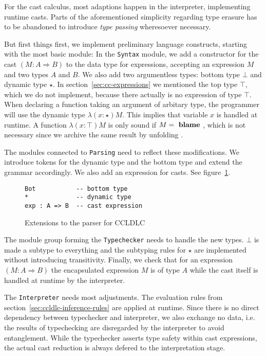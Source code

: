For the cast calculus, most adaptions happen in the interpreter, implementing runtime casts. Parts of the aforementioned simplicity regarding type erasure has to be abandoned to introduce \emph{type passing} wheresoever necessary.

But first things first, we implement preliminary language constructs, starting with the most basic module: In the \texttt{Syntax} module, we add a constructor for the cast $(M : A \Rightarrow B)$ to the data type for expressions, accepting an expression $M$ and two types $A$ and $B$. We also add two argumentless types: bottom type $\bot$ and dynamic type $\star$. In section~\ref{sec:cc-expressions} we mentioned the top type $\top$, which we do not implement, because there actually is no expression of type $\top$. When declaring a function taking an argument of arbitary type, the programmer will use the dynamic type $\lambda(x:\star)M$. This implies that variable $x$ is handled at runtime. A function $\lambda(x:\top)M$ is only sound if $M = \text{ \textbf{blame} }$, which is not necessary since we archive the same result by unfolding .

The modules connected to \texttt{Parsing} need to reflect these modifications. We introduce tokens for the dynamic type and the bottom type and extend the grammar accordingly. We also add an expression for casts. See figure~\ref{fig:ccldlc-grammar}.

\begin{figure}
\begin{lstlisting}[language=ldgv]
Bot           -- bottom type
*             -- dynamic type
exp : A => B  -- cast expression
\end{lstlisting}
\caption{Extensions to the parser for CCLDLC}
\label{fig:ccldlc-grammar}
\end{figure}

The module group forming the \texttt{Typechecker} needs to handle the new types. $\bot$ is made a subtype to everything and the subtyping rules for $\star$ are implemented without introducing transitivity. Finally, we check that for an expression $(M : A \Rightarrow B)$ the encapsulated expression $M$ is of type $A$ while the cast itself is handled at runtime by the interpreter.

The \texttt{Interpreter}  needs most adjustments. The evaluation rules from section~\ref{sec:ccldlc-inference-rules} are applied at runtime. Since there is no direct dependency between typechecker and interpreter, we also exchange no data, i.e. the results of typechecking are disregarded by the interpreter to avoid entanglement. While the typechecker asserts type safety within cast expressions, the actual cast reduction is always defered to the interpretation stage.

